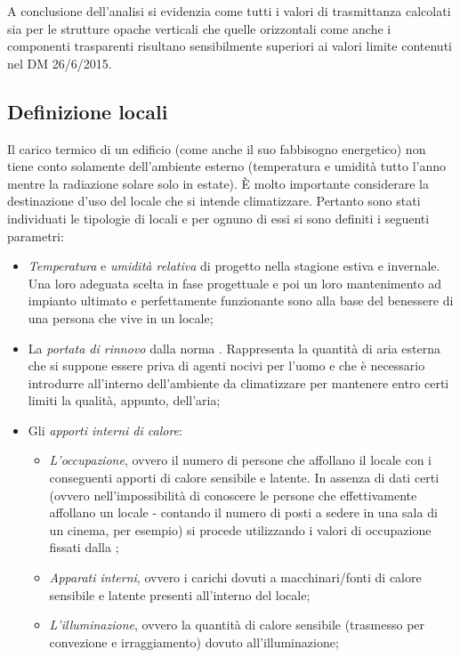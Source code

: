 A conclusione dell'analisi si evidenzia come tutti i valori di trasmittanza calcolati sia per le strutture opache verticali che quelle orizzontali come anche i componenti trasparenti risultano sensibilmente superiori ai valori limite contenuti nel DM 26/6/2015.

\subsection{Definizione locali}
Il carico termico di un edificio (come anche il suo fabbisogno energetico) non tiene conto solamente dell'ambiente esterno (temperatura e umidità tutto l'anno mentre la radiazione solare solo in estate). È molto importante considerare la destinazione d'uso del locale che si intende climatizzare. Pertanto sono stati individuati le tipologie di locali e per ognuno di essi si sono definiti i seguenti parametri:
\begin{itemize}
	\item \emph{Temperatura} e \emph{umidità relativa} di progetto nella stagione estiva e invernale. Una loro adeguata scelta in fase progettuale e poi un loro mantenimento ad impianto ultimato e perfettamente funzionante sono alla base del benessere di una persona che vive in un locale;
	\item La \emph{portata di rinnovo} dalla norma \norvent. Rappresenta la quantità di aria esterna che si suppone essere priva di agenti nocivi per l'uomo e che è necessario introdurre all'interno dell'ambiente da climatizzare per mantenere entro certi limiti la qualità, appunto, dell'aria;
	\item Gli \emph{apporti interni di calore}:
	\begin{itemize}
		\item \emph{L'occupazione}, ovvero il numero di persone che affollano il locale con i conseguenti apporti di calore sensibile e latente. In assenza di dati certi (ovvero nell'impossibilità di conoscere le persone che effettivamente affollano un locale - contando il numero di posti a sedere in una sala di un cinema, per esempio) si procede utilizzando i valori di occupazione fissati dalla \norvent;
		\item \emph{Apparati interni}, ovvero i carichi dovuti a macchinari/fonti di calore sensibile e latente presenti all'interno del locale;
		\item \emph{L'illuminazione}, ovvero la quantità di calore sensibile (trasmesso per convezione e irraggiamento) dovuto all'illuminazione;
	\end{itemize}
\end{itemize}
